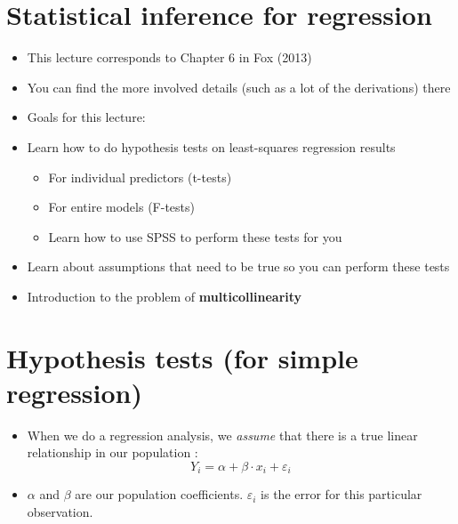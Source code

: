 \documentclass[]{article}
\providecommand{\tightlist}{%
  \setlength{\itemsep}{0pt}\setlength{\parskip}{0pt}}
\begin{document}
\section{Statistical inference for
regression}\label{statistical-inference-for-regression}

\begin{itemize}
\tightlist
\item
  This lecture corresponds to Chapter 6 in Fox (2013)
\item
  You can find the more involved details (such as a lot of the
  derivations) there
\item
  Goals for this lecture:
\item
  Learn how to do hypothesis tests on least-squares regression results

  \begin{itemize}
  \tightlist
  \item
    For individual predictors (t-tests)
  \item
    For entire models (F-tests)
  \item
    Learn how to use SPSS to perform these tests for you
  \end{itemize}
\item
  Learn about assumptions that need to be true so you can perform these
  tests
\item
  Introduction to the problem of \textbf{multicollinearity}
\end{itemize}

\section{Hypothesis tests (for simple
regression)}\label{hypothesis-tests-for-simple-regression}

\begin{itemize}
\tightlist
\item
  When we do a regression analysis, we \emph{assume} that there is a
  true linear relationship in our population :
  \[Y_i = \alpha + \beta\cdot x_i + \varepsilon_i\]
\item
  \(\alpha\) and \(\beta\) are our population coefficients.
  \(\varepsilon_i\) is the error for this particular observation.
\end{itemize}
\end{document}

